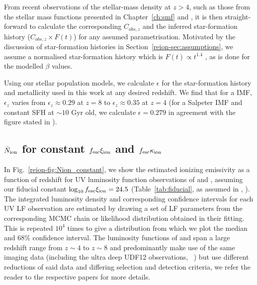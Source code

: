 From recent observations of the stellar-mass density at $z > 4$, such as those from the stellar mass functions presented in Chapter~\ref{ch:smf} and \citet{Grazian:2014vx}, it is then straight-forward to calculate the corresponding $C_{obs,z}$ and the inferred star-formation history ($C_{obs,z}\times F(t)$) for any assumed parametrisation. Motivated by the discussion of star-formation histories in Section~\ref{reion-sec:assumptions}, we assume a normalised star-formation history which is $F(t) \propto t^{1.4}$ \citep{2015ApJ...799..183S}, as is done for the modelled $\beta$ values.

Using our stellar population models, we calculate $\epsilon$ for the star-formation history and metallicity used in this work at any desired redshift. We find that for a \citet{Chabrier:2003ki} IMF, $\epsilon_{z}$ varies from $\epsilon_{z} \approx 0.29$ at $z = 8$ to $\epsilon_{z} \approx 0.35$ at $z = 4$ (for a Salpeter IMF and constant SFH at $\sim 10$ Gyr old, we calculate $\epsilon = 0.279$ in agreement with the figure stated in ).

\subsection{$\dot{N}_{\rm{ion}}$ for constant $f_{\rm{esc}}\xi_{\rm{ion}}$ and $f_{\rm{esc}}\kappa_{\rm{ion}}$}
In Fig.~\ref{reion-fig:Nion_constant}, we show the estimated ionizing emissivity as a function of redshift for UV luminosity function observations of \citet{2015ApJ...803...34B,Finkelstein:2014ub,Oesch:2014cs} and \citet{McLeod:2014wz}, assuming our fiducial constant $\log_{10}f_{\rm{esc}}\xi_{\rm{ion}} = 24.5$ (Table~\ref{tab:fiducial}, as assumed in \citeauthor{Robertson:2013ji}, \citeyear{Robertson:2013ji}). The integrated luminosity density and corresponding confidence intervals for each UV LF observation are estimated by drawing a set of LF parameters from the corresponding MCMC chain or likelihood distribution obtained in their fitting. This is repeated $10^{4}$ times to give a distribution from which we plot the median and $68\%$ confidence interval. The luminosity functions of \citet{2015ApJ...803...34B} and \citet{Finkelstein:2014ub} span a large redshift range from $z\sim4$ to $z\sim8$ and predominantly make use of the same imaging data (including the ultra deep UDF12 observations, \citeauthor{Koekemoer:2013db}~\citeyear{Koekemoer:2013db}) but use different reductions of said data and differing selection and detection criteria, we refer the reader to the respective papers for more details. 

